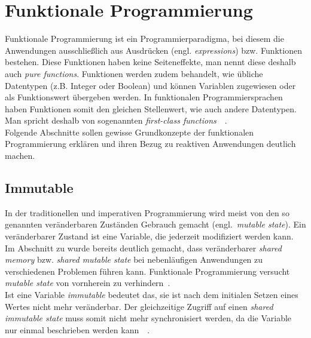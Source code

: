 \section{Funktionale Programmierung}
Funktionale Programmierung ist ein Programmierparadigma, bei diesem die Anwendungen ausschließlich aus Ausdrücken (engl. \textit{expressions}) bzw. Funktionen bestehen. Diese Funktionen haben keine Seiteneffekte, man nennt diese deshalb auch \textit{pure functions}. Funktionen werden zudem behandelt, wie übliche Datentypen (z.B. Integer oder Boolean) und können Variablen zugewiesen oder als Funktionswert übergeben werden. In funktionalen Programmiersprachen haben Funktionen somit den gleichen Stellenwert, wie auch andere Datentypen. Man spricht deshalb von sogenannten \textit{first-class functions}~\cite[S.~50]{butcher_seven_2014}~\cite[S.~3~\&~S.~19]{chiusano_functional_2015}.\\
Folgende Abschnitte sollen gewisse Grundkonzepte der funktionalen Programmierung erklären und ihren Bezug zu reaktiven Anwendungen deutlich machen. 

\subsection{Immutable}
In der traditionellen und imperativen Programmierung wird meist von den so genannten veränderbaren Zuständen Gebrauch gemacht (engl.~\textit{mutable state}). Ein veränderbarer Zustand ist eine Variable, die jederzeit modifiziert werden kann. Im Abschnitt zu  wurde bereits deutlich gemacht, dass veränderbarer \textit{shared memory} bzw. \textit{shared mutable state} bei nebenläufigen Anwendungen zu verschiedenen Problemen führen kann. Funktionale Programmierung versucht \textit{mutable state} von vornherein zu verhindern~\cite[S.~50]{butcher_seven_2014}.\\
Ist eine Variable \textit{immutable} bedeutet das, sie ist nach dem initialen Setzen eines Wertes nicht mehr veränderbar. Der gleichzeitige Zugriff auf einen \textit{shared immutable state} muss somit nicht mehr synchronisiert werden, da die Variable nur einmal beschrieben werden kann~\cite[S.~50]{butcher_seven_2014}~\cite[S.~62]{kuhn_reactive_2015}.

\pagebreak

